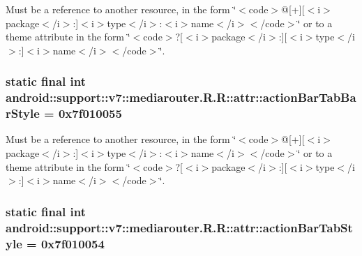 Must be a reference to another resource, in the form \char`\"{}$<$code$>$@\mbox{[}+\mbox{]}\mbox{[}$<$i$>$package$<$/i$>$:\mbox{]}$<$i$>$type$<$/i$>$:$<$i$>$name$<$/i$>$$<$/code$>$\char`\"{} or to a theme attribute in the form \char`\"{}$<$code$>$?\mbox{[}$<$i$>$package$<$/i$>$:\mbox{]}\mbox{[}$<$i$>$type$<$/i$>$:\mbox{]}$<$i$>$name$<$/i$>$$<$/code$>$\char`\"{}. \hypertarget{classandroid_1_1support_1_1v7_1_1mediarouter_1_1_r_1_1attr_f54c98919e134581bc5c9afe8810945b}{
\subsubsection[{actionBarTabBarStyle}]{\setlength{\rightskip}{0pt plus 5cm}static final int android::support::v7::mediarouter.R.R::attr::actionBarTabBarStyle = 0x7f010055}}
\label{classandroid_1_1support_1_1v7_1_1mediarouter_1_1_r_1_1attr_f54c98919e134581bc5c9afe8810945b}


Must be a reference to another resource, in the form \char`\"{}$<$code$>$@\mbox{[}+\mbox{]}\mbox{[}$<$i$>$package$<$/i$>$:\mbox{]}$<$i$>$type$<$/i$>$:$<$i$>$name$<$/i$>$$<$/code$>$\char`\"{} or to a theme attribute in the form \char`\"{}$<$code$>$?\mbox{[}$<$i$>$package$<$/i$>$:\mbox{]}\mbox{[}$<$i$>$type$<$/i$>$:\mbox{]}$<$i$>$name$<$/i$>$$<$/code$>$\char`\"{}. \hypertarget{classandroid_1_1support_1_1v7_1_1mediarouter_1_1_r_1_1attr_ef52b126a227a145b9060f7d5e410927}{
\subsubsection[{actionBarTabStyle}]{\setlength{\rightskip}{0pt plus 5cm}static final int android::support::v7::mediarouter.R.R::attr::actionBarTabStyle = 0x7f010054}}
\label{classandroid_1_1support_1_1v7_1_1mediarouter_1_1_r_1_1attr_ef52b126a227a145b9060f7d5e410927}


